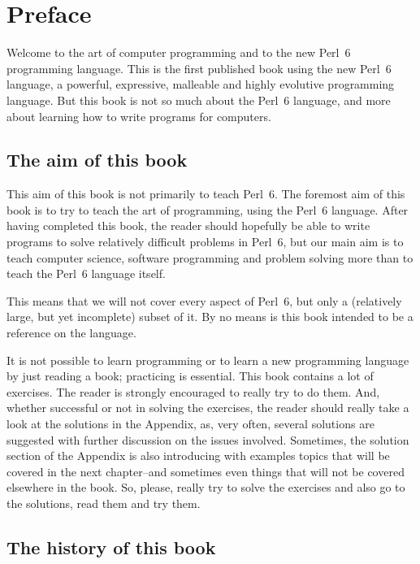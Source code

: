 
\chapter{Preface}

Welcome to the art of computer programming and to the 
new Perl~6 programming language. This is the 
first published book using the new Perl~6 language, 
a powerful, expressive, malleable and highly evolutive 
programming language. But this book is not so much 
about the Perl~6 language, and more about learning 
how to write programs for computers.

\section*{The aim of this book}

This aim of this book is not primarily to teach Perl~6. 
The foremost aim of this book is to try to teach the art 
of programming, using the Perl~6 language. After having 
completed this book, the reader should hopefully be able 
to write programs to solve relatively difficult problems in 
Perl~6, but our main aim is to teach computer science, software 
programming and problem solving more than to teach the Perl~6 
language itself. 

This means that we will not cover every aspect of Perl~6, but 
only a (relatively large, but yet incomplete) subset of it. 
By no means is this book intended to be a reference on the 
language.

It is not possible to learn programming or to learn a new 
programming language by just reading a book; practicing 
is essential. This book contains a lot of exercises. The 
reader is strongly encouraged to really try to do them. And, 
whether successful or not in solving the exercises, the reader 
should really take a look at the solutions in the Appendix, 
as, very often, several solutions are suggested with further 
discussion on the issues involved. Sometimes, the solution 
section of the Appendix is also introducing with examples topics 
that will be covered in the next chapter--and sometimes even 
things that will not be covered elsewhere in the book. So, 
please, really try to solve the exercises and also go to 
the solutions, read them and try them.


\section*{The history of this book}

